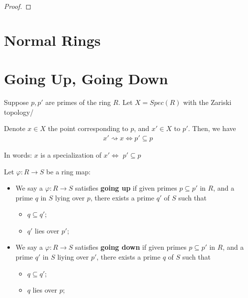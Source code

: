 \documentclass[Total.tex]{subfiles}
\begin{document}
			\begin{proof}
			\end{proof}
			
			\begin{Def}
			\end{Def}
			
		\section{Normal Rings}
		
			\begin{Def}
			\end{Def}
			
		\section{Going Up, Going Down}
			\qquad Suppose $p,p'$ are primes of the ring $R$. Let $X=Spec(R)$ with the Zariski topology/
			
			Denote $x\in X$ the point corresponding to $p$, and $x'\in X$ to $p'$. Then, we have
			\begin{gather*}
				x'\rightsquigarrow x\Leftrightarrow p'\subseteq p
			\end{gather*}
			
			In words: $x$ is a specialization of $x'\Leftrightarrow$ $p'\subseteq p$
			\begin{Def}
				Let $\varphi:R\rightarrow S$ be a ring map:
				\begin{itemize}
					\item We say a $\varphi:R\rightarrow S$ satisfies \textbf{going up} if given primes $p\subseteq p'$ in $R$, and a prime $q$ in $S$ lying over $p$, there exists a prime $q'$ of $S$ such that
					\begin{itemize}
						\item $q\subseteq q'$;
						\item $q'$ lies over $p'$;
					\end{itemize}
					
					\item We say a $\varphi:R\rightarrow S$ satisfies \textbf{going down} if given primes $p\subseteq p'$ in $R$, and a prime $q'$ in $S$ liying over $p'$, there exists a prime $q$ of $S$ such that
					\begin{itemize}
						\item $q\subseteq q'$;
						\item $q$ lies over $p$;
					\end{itemize}
				\end{itemize}
			\end{Def}
			
\end{document}
